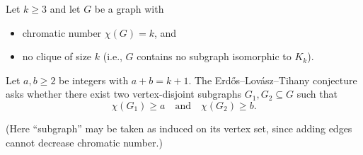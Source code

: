 Let $k\ge3$ and let $G$ be a graph with
\begin{itemize}
\item chromatic number $\chi(G)=k$, and
\item no clique of size $k$ (i.e., $G$ contains no subgraph isomorphic to $K_k$).
\end{itemize}
Let $a,b\ge2$ be integers with $a+b=k+1$.
The Erd\H{o}s--Lov\'asz--Tihany conjecture asks whether there exist two
vertex-disjoint subgraphs $G_1,G_2\subseteq G$ such that
\[
\chi(G_1)\ge a\quad\text{and}\quad \chi(G_2)\ge b.
\]

(Here ``subgraph'' may be taken as induced on its vertex set, since adding edges
cannot decrease chromatic number.)
